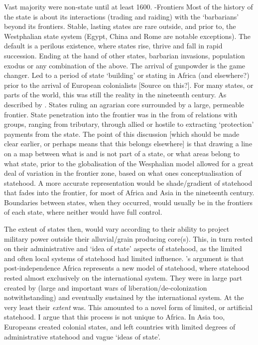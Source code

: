 Vast majority were non-state until at least 1600. -Frontiers Most of the history
of the state is about its interactions (trading and raiding) with the
`barbarians' beyond its frontiers. Stable, lasting states are rare outside, and
prior to, the Westphalian state system (Egypt, China and Rome are notable
exceptions). The default is a perilous existence, where states rise, thrive and
fall in rapid succession. Ending at the hand of other states, barbarian
invasions, population exodus or any combination of the above. The arrival of
gunpowder is the game changer. Led to a period of state `building' or stating in
Africa (and elsewhere?) prior to the arrival of European colonialists [Source on
this?]. For many states, or parts of the world, this was still the reality in
the nineteenth century. As described by	\citet{Scott2009}. States ruling an
agrarian core surrounded by a large, permeable frontier. State penetration into
the frontier was in the from of relations with groups, ranging from tributary,
through allied or hostile to extracting `protection' payments from the state.
The point of this discussion [which should be made clear earlier, or perhaps
means that this belongs elsewhere] is that drawing a line on a map between what
is and is not part of a state, or what areas belong to what state, prior to the
globalisation of the Wesphalian model allowed for a great deal of variation in
the frontier zone, based on what ones conceptualisation of statehood. A more
accurate representation would be shade/gradient of statehood that fades into the
frontier, for most of Africa and Asia in the nineteenth century. Boundaries
between states, when they occurred, would usually be in the frontiers of each
state, where neither would have full control.

The extent of states then, would vary according to their ability to project
military power outside their alluvial/grain producing core(s). This, in turn
rested on their administrative and `idea of state' aspects of statehood, as the
limited and often local systems of statehood had limited influence.
\citet{Clapham1996}'s argument is that post-independence Africa represents a new
model of statehood, where statehood rested almost exclusively on the
international system. They were in large part created by (large and important
wars of liberation/de-colonization notwithstanding) and eventually sustained by
the international system. At the very least their \textit{extent} was. This
amounted to a novel form of limited, or artificial statehood. I argue that this
process is not unique to Africa. In Asia too, Europeans created colonial states,
and left countries with limited degrees of administrative statehood and vague
`ideas of state'.

